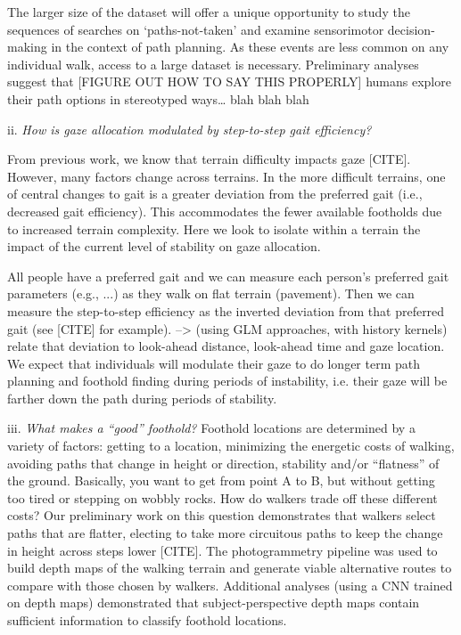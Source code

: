 The larger size of the dataset will offer a unique opportunity to study the sequences of searches on `paths-not-taken' and examine sensorimotor decision-making in the context of path planning. As these events are less common on any individual walk, access to a large dataset is necessary. Preliminary analyses suggest that [FIGURE OUT HOW TO SAY THIS PROPERLY] humans explore their path options in stereotyped ways\ldots{} blah blah blah

ii. \emph{How is gaze allocation modulated by step-to-step gait
efficiency?}

From previous work, we know that terrain difficulty impacts gaze [CITE]. However, many factors change across terrains. In the more difficult terrains, one of central changes to gait is a greater deviation from the preferred gait (i.e., decreased gait efficiency). This accommodates the fewer available footholds due to increased terrain complexity. Here we look to isolate within a terrain the impact of the current level of stability on gaze allocation.

All people have a preferred gait and we can measure each person's preferred gait parameters (e.g., ...) as they walk on flat terrain (pavement). Then we can measure the step-to-step efficiency as the inverted deviation from that preferred gait (see [CITE] for example).  --> (using GLM approaches, with history kernels) relate that deviation to look-ahead distance, look-ahead time and gaze location. We expect that individuals will modulate their gaze to do longer term path planning and foothold finding during periods of instability, i.e. their gaze will be farther down the path during periods of stability.

iii. \emph{What makes a ``good'' foothold?} Foothold locations are
determined by a variety of factors: getting to a location, minimizing the energetic costs of walking, avoiding paths that change in height or direction, stability and/or ``flatness'' of the ground. Basically, you want to get from point A to B, but without getting too tired or stepping on wobbly rocks. How do walkers trade off these different costs? Our preliminary work on this question demonstrates that walkers select paths that are flatter, electing to take more circuitous paths to keep the change in height across steps lower [CITE]. The photogrammetry pipeline was used to build depth maps of the walking terrain and generate viable alternative routes to compare with those chosen by walkers. Additional analyses (using a CNN trained on depth maps) demonstrated that subject-perspective depth maps contain sufficient information to classify foothold locations.

